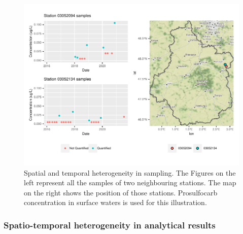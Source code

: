 \begin{figure}[htbp]
    \centering
    \includegraphics{figs/Chap3/Hetero_ex.pdf}
    \caption{Spatial and temporal heterogeneity in sampling. The Figures on the left represent all the samples of two neighbouring stations. The map on the right shows the position of those stations. Prosulfocarb concentration in surface waters is used for this illustration.}
    \label{fig:het_samp_ex}
\end{figure}

\subsubsection{Spatio-temporal heterogeneity in analytical results}

